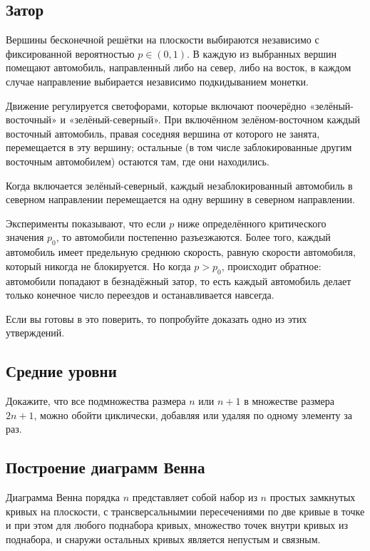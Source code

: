 \subsection*{Затор}

Вершины бесконечной решётки на плоскости выбираются независимо с фиксированной вероятностью $p\in (0,1)$.
В каждую из выбранных вершин помещают автомобиль, направленный либо на север, либо на восток,
в каждом  случае направление выбирается независимо подкидыванием монетки.

Движение регулируется светофорами, которые включают поочерёдно «зелёный-восточный» и «зелёный-северный».
При включённом зелёном-восточном каждый восточный автомобиль, правая соседняя вершина от которого не занята, перемещается в эту вершину; остальные (в том числе заблокированные другим восточным автомобилем) остаются там, где они находились.

Когда включается зелёный-северный, каждый незаблокированный автомобиль в северном направлении перемещается на одну вершину в северном направлении.

Эксперименты показывают, что если $p$ ниже определённого критического значения $p_0$,
то автомобили постепенно разъезжаются.
Более того, каждый автомобиль имеет предельную среднюю скорость, равную скорости автомобиля, который никогда не блокируется.
Но когда $p> p_0$, происходит обратное: автомобили попадают в безнадёжный затор, то есть каждый автомобиль делает только конечное число переездов и останавливается навсегда.

Если вы готовы в это поверить, то попробуйте доказать одно из этих утверждений.

\subsection*{Средние уровни}

Докажите, что все подмножества размера $n$ или $n+1$ в множестве размера $2n+1$, можно обойти циклически, добавляя или удаляя по одному элементу за раз.

\subsection*{Построение диаграмм Венна}

Диаграмма Венна порядка $n$ представляет собой набор из $n$ простых замкнутых кривых на плоскости, с трансверсальнымии пересечениями  по две кривые в точке и при этом для любого поднабора кривых, множество точек внутри кривых из поднабора, и снаружи остальных кривых является непустым и связным.

